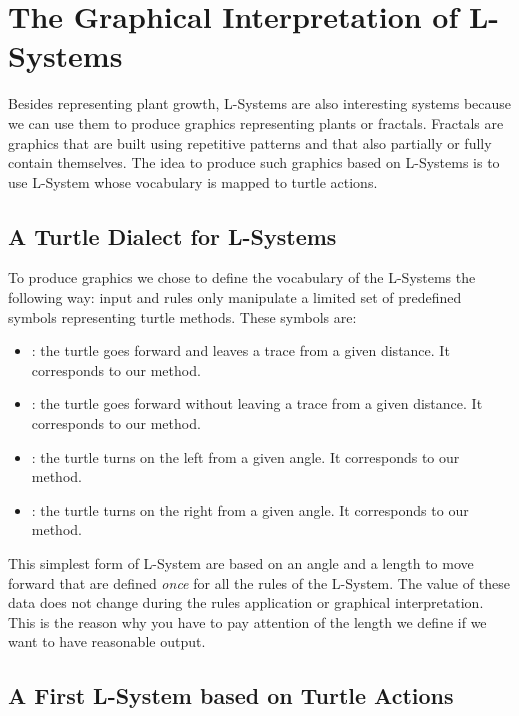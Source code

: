 \section{The Graphical Interpretation of L-Systems}
Besides representing plant growth, L-Systems are also interesting
systems because we can use them to produce graphics representing
plants or fractals. Fractals are graphics that are built using
repetitive patterns and that also partially or fully contain
themselves. The idea to produce such graphics based on L-Systems is to use L-System whose vocabulary is mapped to turtle actions. 

\subsection{A Turtle Dialect for L-Systems}
To produce graphics we chose to define the vocabulary of the L-Systems  the following way: input and rules only manipulate a limited set of predefined symbols representing turtle methods. These symbols are:

\begin{itemize}
\item[\ct{F}]: the turtle goes forward and leaves a trace from a given distance. 
It corresponds to  our \go method.

\item[\ct{f}]: the turtle goes forward without leaving a trace from a given distance. It corresponds to our \jump method.

\item[\ct{+}]: the turtle turns on the left from a given angle. 
It corresponds to our \turnLeft method.

\item[\ct{-}]: the turtle turns on the right from a given angle. 
It corresponds to our \turnRight method.
\end{itemize}

This simplest form of L-System are based on an angle and a length to
move forward that are defined \emph{once} for all the rules of the
L-System. The value of these data does not change during the rules
application or graphical interpretation. This is the reason why you
have to pay attention of the length we define if we want to have
reasonable output. 

\subsection{A First L-System based on Turtle Actions}

